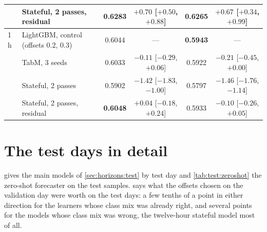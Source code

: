 \begin{table}[t]
\begin{fittable}
\begin{tabular}{llcccc}
       & Stateful, 2 passes, residual    & \textbf{0.6283} & $\mathbf{+0.70}$ [$+0.50$, $+0.88$] & \textbf{0.6265} & $\mathbf{+0.67}$ [$+0.34$, $+0.99$] \\
\midrule
1 h    & LightGBM, control (offsets 0.2, 0.3)  & 0.6044 & --- & \textbf{0.5943} & --- \\
       & TabM, 3 seeds                   & 0.6033 & $-0.11$ [$-0.29$, $+0.06$] & 0.5922 & $-0.21$ [$-0.45$, $+0.00$] \\
       & Stateful, 2 passes              & 0.5902 & $-1.42$ [$-1.83$, $-1.00$] & 0.5797 & $-1.46$ [$-1.76$, $-1.14$] \\
       & Stateful, 2 passes, residual    & \textbf{0.6048} & $+0.04$ [$-0.18$, $+0.24$] & 0.5933 & $-0.10$ [$-0.26$, $+0.05$] \\
\bottomrule
\end{tabular}\end{fittable}
\end{table}

\section{The test days in detail}
\label{app:results:test}

 gives the main models of \cref{sec:horizons:test} by test day and
\cref{tab:test:zeroshot} the zero-shot forecaster on the test samples.  
says what the offsets chosen on the validation day were worth on the test days: a few tenths
of a point in either direction for the learners whose class mix was already right, and
several points for the models whose class mix was wrong, the twelve-hour stateful model
most of all.

